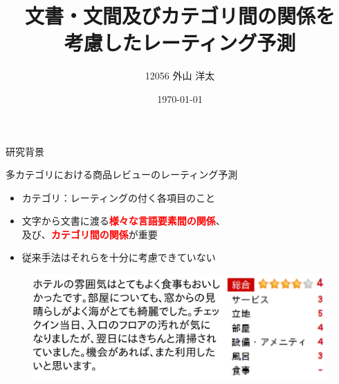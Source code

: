 \documentclass[aspectratio=43,unicode,10pt]{beamer}
\title{文書・文間及びカテゴリ間の関係を\\考慮したレーティング予測}
\institute{知能数理研究室}
\author{12056 外山 洋太}
\date{\today}
\newcommand{\fire}[1]{\textcolor{red}{\textbf{#1}}}
\begin{document}
\begin{frame}
\titlepage
\end{frame}

\begin{frame}{研究背景}{}
  \begin{block}{多カテゴリにおける商品レビューのレーティング予測}
    \begin{itemize}
      \item カテゴリ：レーティングの付く各項目のこと
      \item 文字から文書に渡る\fire{様々な言語要素間の関係}、 \\
            及び、\fire{カテゴリ間の関係}が重要
      \item 従来手法はそれらを十分に考慮できていない
    \end{itemize}
  \end{block}
  \begin{figure}
    \includegraphics[width=0.9\linewidth]{fig/review.png}
  \end{figure}
\end{frame}
\end{document}
